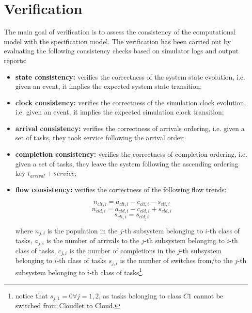 \section{Verification}
\label{sec:performance-modeling-verification}
The main goal of verification is to assess the consistency of the computational model with the specification model.
The verification has been carried out by evaluating the following consistency checks based on simulator logs and output reports:

\begin{itemize}
	\item \textbf{state consistency:} verifies the correctness of the system state evolution, i.e. given an event, it implies the expected system state transition;
	
	\item \textbf{clock consistency:} verifies the correctness of the simulation clock evolution, i.e. given an event, it implies the expected simulation clock transition;
	
	\item \textbf{arrival consistency:} verifies the correctness of arrivals ordering, i.e. given a set of tasks, they took service following the arrival order;
	
	\item \textbf{completion consistency:} verifies the correctness of completion ordering, i.e. given a set of tasks, they leave the system following the ascending ordering key $t_{arrival}+service$;
	
	\item \textbf{flow consistency:} verifies the correctness of the following flow trends:
	
	\begin{equation}
	n_{clt,i}=a_{clt,i}-c_{clt,i}-s_{clt,i}
	\end{equation}
	\begin{equation}
	n_{cld,i}=a_{cld,i}-c_{cld,i}+s_{cld,i}
	\end{equation}
	\begin{equation}
	s_{clt,i}=s_{cld,i}
	\end{equation}
	
	where 
	$n_{j,i}$ is the population in the $j$-th subsystem belonging to $i$-th class of tasks, 
	$a_{j,i}$ is the number of arrivals to the $j$-th subsystem belonging to $i$-th class of tasks,
	$c_{j,i}$ is the number of completions in the $j$-th subsystem belonging to $i$-th class of tasks
	$s_{j,i}$ is the number of switches from/to the $j$-th subsystem belonging to $i$-th class of tasks\footnote{notice that $s_{j,1}=0\forall j=1,2$, as tasks belonging to class $C1$ cannot be switched from Cloudlet to Cloud.}.
	 

\end{itemize}
